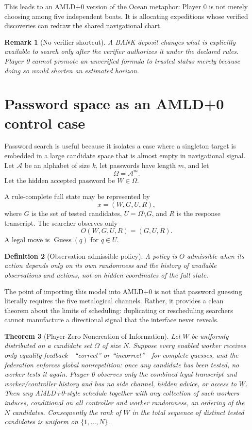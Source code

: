 \documentclass[11pt]{article}
\newtheorem{definition}{Definition}[section]
\newtheorem{remark}[definition]{Remark}
\newtheorem{theorem}[definition]{Theorem}
\newcommand{\A}{\mathcal{A}}
\begin{document}
This leads to an AMLD+0 version of the Ocean metaphor: Player 0 is not merely
choosing among five independent boats.  It is allocating expeditions whose
verified discoveries can redraw the shared navigational chart.

\begin{remark}[No verifier shortcut]
A BANK deposit changes what is explicitly available to search only after the
verifier authorizes it under the declared rules.  Player 0 cannot promote an
unverified formula to trusted status merely because doing so would shorten an
estimated horizon.
\end{remark}

\section{Password space as an AMLD+0 control case}

Password search is useful because it isolates a case where a singleton target
is embedded in a large candidate space that is almost empty in navigational signal.
Let $\A$ be an alphabet of size $k$, let passwords have length $m$, and let
\[
\Omega=\A^m.
\]
Let the hidden accepted password be $W\in\Omega$.

A rule-complete full state may be represented by
\[
x=(W,G,U,R),
\]
where $G$ is the set of tested candidates, $U=\Omega\setminus G$, and $R$ is
the response transcript.  The searcher observes only
\[
O(W,G,U,R)=(G,U,R).
\]
A legal move is $\operatorname{Guess}(q)$ for $q\in U$.

\begin{definition}[Observation-admissible policy]
A policy is $O$-admissible when its action depends only on its own randomness
and the history of available observations and actions, not on hidden
coordinates of the full state.
\end{definition}

The point of importing this model into AMLD+0 is not that password guessing
literally requires the five metalogical channels.  Rather, it provides a
clean theorem about the limits of scheduling: duplicating or rescheduling
searchers cannot manufacture a directional signal that the interface never
reveals.

\begin{theorem}[Player-Zero Noncreation of Information]
Let $W$ be uniformly distributed on a candidate set $\Omega$ of size $N$.
Suppose every enabled worker receives only equality feedback---``correct'' or
``incorrect''---for complete guesses, and the federation enforces global
nonrepetition: once any candidate has been tested, no worker tests it again.
Player 0 observes only the combined legal transcript and worker/controller
history and has no side channel, hidden advice, or access to $W$.  Then any
AMLD+0-style schedule together with any collection of such workers induces,
conditional on all controller and worker randomness, an ordering of the $N$
candidates.
Consequently the rank of $W$ in the total sequence of distinct tested
candidates is uniform on $\{1,\ldots,N\}$.
\end{theorem}
\end{document}
